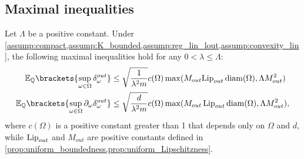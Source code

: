\subsection{Maximal inequalities}\label{app_subsec:max_in}
\begin{proposition}\label{prop:exp_uni_bound}
Let $\Lambda$ be a positive constant. 
Under \cref{assump:compact,assump:K_bounded,assump:reg_lin_lout,assump:convexity_lin}, the following maximal inequalities hold for any $0<\lambda \leq \Lambda$:
\begin{align*}
	\mathbb{E}_{\mathbb{Q}}\brackets{\sup_{\omega\in \Omega} \Dout }
	 &\leq {\sqrt{\frac{1}{\lambda^2 m}}c(\Omega)\max(M_{out}{\lipout}\diam(\Omega),\Lambda {M_{out}^2})}\\
	 \mathbb{E}_{\mathbb{Q}}\brackets{\sup_{\omega\in \Omega} \Doutw }
	&\leq {\sqrt{\frac{d}{\lambda^2m}}c(\Omega)\max(M_{out}\lipout\diam(\Omega),\Lambda M_{out}^2)}, 
\end{align*}
    where $c(\Omega)$ is a positive constant {greater than 1} that depends only on $\Omega$ and $d$, while {$\operatorname{Lip}_{out}$ and $M_{out}$ are positive constants defined in \cref{prop:uniform_boundedness,prop:uniform_Lipschitzness}}. 
\end{proposition}
